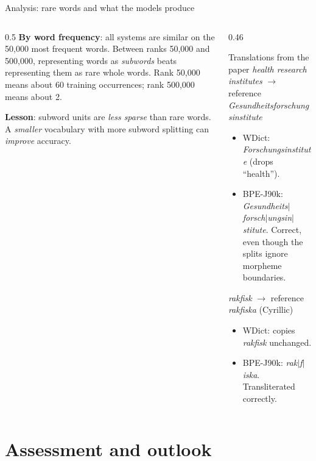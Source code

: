 \documentclass[aspectratio=169,11pt]{beamer}
\begin{document}
\begin{frame}{Analysis: rare words and what the models produce}
  \begin{columns}[T]
    \begin{column}{0.5\textwidth}
      \small
      \textbf{By word frequency}: all systems are similar on the 50,000 most frequent words.
      Between ranks 50,000 and 500,000, representing words as \emph{subwords} beats representing them as rare whole words.
      Rank 50,000 means about 60 training occurrences; rank 500,000 means about 2.
      \vspace{1mm}

      \textbf{Lesson}: subword units are \emph{less sparse} than rare words. A \emph{smaller} vocabulary with more subword splitting can \emph{improve} accuracy.
    \end{column}
    \begin{column}{0.46\textwidth}
      \begin{exampleblock}{Translations from the paper}
        \scriptsize
        \emph{health research institutes} $\to$ reference \emph{Gesundheitsforschungsinstitute}
        \begin{itemize}
          \item WDict: \emph{Forschungsinstitute} (drops ``health'').
          \item BPE-J90k: \emph{Gesundheits$|$forsch$|$ungsin$|$stitute}. Correct, even though the splits ignore morpheme boundaries.
        \end{itemize}
        \emph{rakfisk} $\to$ reference \emph{rakfiska} (Cyrillic)
        \begin{itemize}
          \item WDict: copies \emph{rakfisk} unchanged.
          \item BPE-J90k: \emph{rak$|$f$|$iska}. Transliterated correctly.
        \end{itemize}
      \end{exampleblock}
    \end{column}
  \end{columns}
\end{frame}

\section{Assessment and outlook}
\end{document}

